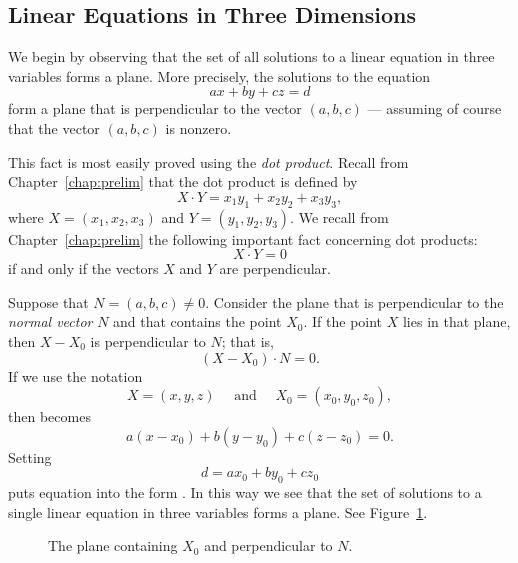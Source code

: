 \documentclass{ximera}
\begin{document}
\subsection*{Linear Equations in Three Dimensions}

We begin by observing that the set of all solutions to a linear
equation in three variables forms a plane.  More
precisely, the solutions to the equation
\begin{equation} \label{abcd}
ax+by+cz=d
\end{equation}
form a plane that is perpendicular to the vector $(a,b,c)$ ---
assuming of course that the vector $(a,b,c)$ is nonzero.

This fact is most easily proved using the {\em dot product\/}.
Recall from Chapter~\ref{chap:prelim}  that
the dot product is defined by
\[
X\cdot Y = x_1y_1+x_2y_2+x_3y_3,
\]
where $X=(x_1,x_2,x_3)$ and $Y=(y_1,y_2,y_3)$.  We recall from
Chapter~\ref{chap:prelim}  the following important
fact concerning dot products:
\[
X\cdot Y = 0
\]
if and only if the vectors $X$ and $Y$ are perpendicular.

Suppose that $N=(a,b,c)\neq 0$.  Consider the plane that is perpendicular
to the {\em normal vector\/} $N$ and that contains the
point $X_0$.  If the point $X$ lies in that plane, then $X-X_0$ is
perpendicular to $N$; that is,
\begin{equation} \label{XX_0}
(X-X_0)\cdot N = 0.
\end{equation}
If we use the notation
\[
X=(x,y,z) \quad \mbox{ and } \quad X_0=(x_0,y_0,z_0),
\]
then  becomes
\[
a(x-x_0)+b(y-y_0)+c(z-z_0)=0.
\]
Setting
\[
d=ax_0 + by_0 + cz_0
\]
puts equation  into the form .  In this way
we see that the set of solutions to a single linear equation in
three variables forms a plane.  See Figure~\ref{F:plane}.

\begin{figure}[htb]
              \centerline{%
              }
              \caption{The plane containing $X_0$ and perpendicular to $N$.}
              \label{F:plane}
\end{figure}
\end{document}
